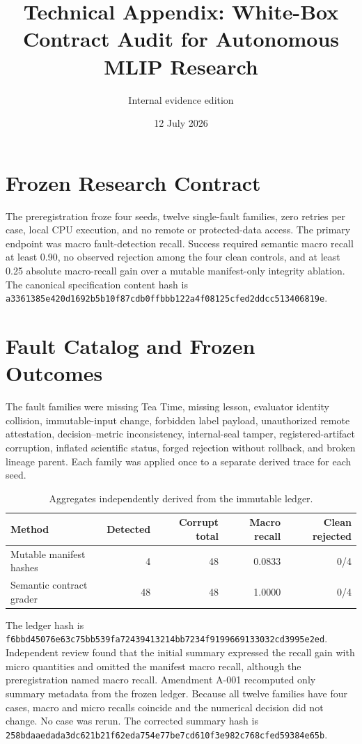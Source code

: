 \documentclass[10pt]{article}
\title{Technical Appendix: White-Box Contract Audit for Autonomous MLIP Research}
\author{Internal evidence edition}
\date{12 July 2026}
\begin{document}
\maketitle

\section{Frozen Research Contract}

The preregistration froze four seeds, twelve single-fault families, zero retries per case, local CPU execution, and no remote or protected-data access. The primary endpoint was macro fault-detection recall. Success required semantic macro recall at least 0.90, no observed rejection among the four clean controls, and at least 0.25 absolute macro-recall gain over a mutable manifest-only integrity ablation. The canonical specification content hash is
\texttt{a3361385e420d1692b5b10f87cdb0ffbbb122a4f08125cfed2ddcc513406819e}.

\section{Fault Catalog and Frozen Outcomes}

The fault families were missing Tea Time, missing lesson, evaluator identity collision, immutable-input change, forbidden label payload, unauthorized remote attestation, decision--metric inconsistency, internal-seal tamper, registered-artifact corruption, inflated scientific status, forged rejection without rollback, and broken lineage parent. Each family was applied once to a separate derived trace for each seed.

\begin{table}[h]
  \centering
  \caption{Aggregates independently derived from the immutable ledger.}
  \begin{tabular}{lrrrr}
    \toprule
    Method & Detected & Corrupt total & Macro recall & Clean rejected \\
    \midrule
    Mutable manifest hashes & 4 & 48 & 0.0833 & 0/4 \\
    Semantic contract grader & 48 & 48 & 1.0000 & 0/4 \\
    \bottomrule
  \end{tabular}
\end{table}

The ledger hash is
\texttt{f6bbd45076e63c75bb539fa72439413214bb7234f9199669133032cd3995e2ed}.
Independent review found that the initial summary expressed the recall gain with micro quantities and omitted the manifest macro recall, although the preregistration named macro recall. Amendment A-001 recomputed only summary metadata from the frozen ledger. Because all twelve families have four cases, macro and micro recalls coincide and the numerical decision did not change. No case was rerun. The corrected summary hash is
\texttt{258bdaaedada3dc621b21f62eda754e77be7cd610f3e982c768cfed59384e65b}.
\end{document}
